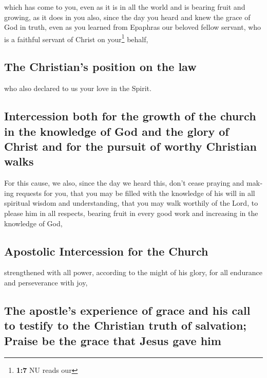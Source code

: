 \begin{paracol}{2}
\begin{otherlanguage}{english}
 which has come to you, even as it is in all the world and
is bearing fruit and growing, as it does in you also, since the day you
heard and knew the grace of God in truth,  even as you
learned from Epaphras our beloved fellow servant, who is a faithful
servant of Christ on your\footnote{\textbf{1:7} NU reads our} behalf,

\hypertarget{the-christians-position-on-the-law}{%
\subsection{The Christian's position on the
law}\label{the-christians-position-on-the-law}}

 who also declared to us your love in the Spirit.

\hypertarget{intercession-both-for-the-growth-of-the-church-in-the-knowledge-of-god-and-the-glory-of-christ-and-for-the-pursuit-of-worthy-christian-walks}{%
\subsection{Intercession both for the growth of the church in the
knowledge of God and the glory of Christ and for the pursuit of worthy
Christian
walks}\label{intercession-both-for-the-growth-of-the-church-in-the-knowledge-of-god-and-the-glory-of-christ-and-for-the-pursuit-of-worthy-christian-walks}}

 For this cause, we also, since the day we heard this,
don't cease praying and making requests for you, that you may be filled
with the knowledge of his will in all spiritual wisdom and
understanding,  that you may walk worthily of the Lord,
to please him in all respects, bearing fruit in every good work and
increasing in the knowledge of God,

\hypertarget{apostolic-intercession-for-the-church}{%
\subsection{Apostolic Intercession for the
Church}\label{apostolic-intercession-for-the-church}}

 strengthened with all power, according to the might of
his glory, for all endurance and perseverance with joy,

\hypertarget{the-apostles-experience-of-grace-and-his-call-to-testify-to-the-christian-truth-of-salvation-praise-be-the-grace-that-jesus-gave-him}{%
\subsection{The apostle's experience of grace and his call to testify to
the Christian truth of salvation; Praise be the grace that Jesus gave
him}\label{the-apostles-experience-of-grace-and-his-call-to-testify-to-the-christian-truth-of-salvation-praise-be-the-grace-that-jesus-gave-him}}


\end{otherlanguage}
\end{paracol}
